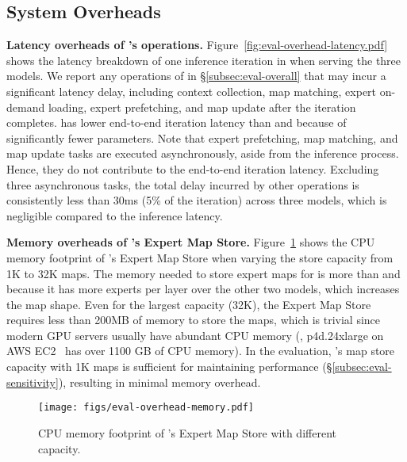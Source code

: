 \subsection{System Overheads}
\label{subsec:eval-overhead}


\noindent \textbf{Latency overheads of \sys's operations.}
Figure~\ref{fig:eval-overhead-latency.pdf} shows the latency breakdown of one inference iteration in \sys when serving the three \MoE models.
We report any operations of \sys in \S\ref{subsec:eval-overall} that may incur a significant latency delay, including context collection, map matching, expert on-demand loading, expert prefetching, and map update after the iteration completes.
\qwen has lower end-to-end iteration latency than \mixtral and \phimoe because of significantly fewer parameters.
Note that expert prefetching, map matching, and map update tasks are executed asynchronously, aside from the inference process. Hence, they do not contribute to the end-to-end iteration latency.
Excluding three asynchronous tasks, the total delay incurred by other operations is consistently less than 30ms (5\% of the iteration) across three \MoE models, which is negligible compared to the inference latency.


\noindent \textbf{Memory overheads of \sys's Expert Map Store.}
Figure~\ref{fig:eval-overhead-memory.pdf} shows the CPU memory footprint of \sys's Expert Map Store when varying the store capacity from 1K to 32K maps.
The memory needed to store expert maps for \qwen is more than \mixtral and \phimoe because it has more experts per layer over the other two models, which increases the map shape.
Even for the largest capacity (32K), the Expert Map Store requires less than 200MB of memory to store the maps, which is trivial since modern GPU servers usually have abundant CPU memory (\eg, p4d.24xlarge on AWS EC2~\cite{aws-ec2} has over 1100 GB of CPU memory).
In the evaluation, \sys's map store capacity with 1K maps is sufficient for maintaining performance (\S\ref{subsec:eval-sensitivity}), resulting in minimal memory overhead.



\begin{figure}[t]
  \centering
  \texttt{[image: figs/eval-overhead-memory.pdf]}
  \caption{CPU memory footprint of \sys's Expert Map Store with different capacity.}
  \vspace{-0.1in}
  \label{fig:eval-overhead-memory.pdf}
\end{figure}
